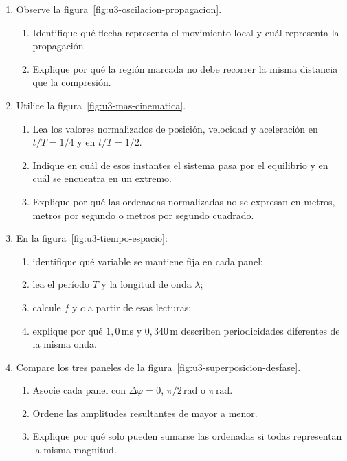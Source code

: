 \begin{enumerate}[label=\textbf{R\arabic*.},leftmargin=*]
    \item Observe la figura~\ref{fig:u3-oscilacion-propagacion}.
    \begin{enumerate}[label=\alph*)]
        \item Identifique qué flecha representa el movimiento local y cuál
        representa la propagación.
        \item Explique por qué la región marcada no debe recorrer la misma
        distancia que la compresión.
    \end{enumerate}

    \item Utilice la figura~\ref{fig:u3-mas-cinematica}.
    \begin{enumerate}[label=\alph*)]
        \item Lea los valores normalizados de posición, velocidad y
        aceleración en \(t/T=1/4\) y en \(t/T=1/2\).
        \item Indique en cuál de esos instantes el sistema pasa por el
        equilibrio y en cuál se encuentra en un extremo.
        \item Explique por qué las ordenadas normalizadas no se expresan en
        metros, metros por segundo o metros por segundo cuadrado.
    \end{enumerate}

    \item En la figura~\ref{fig:u3-tiempo-espacio}:
    \begin{enumerate}[label=\alph*)]
        \item identifique qué variable se mantiene fija en cada panel;
        \item lea el período \(T\) y la longitud de onda \(\lambda\);
        \item calcule \(f\) y \(c\) a partir de esas lecturas;
        \item explique por qué \(1{,}0\,\text{ms}\) y
        \(0{,}340\,\text{m}\) describen periodicidades diferentes de la misma
        onda.
    \end{enumerate}

    \item Compare los tres paneles de la
    figura~\ref{fig:u3-superposicion-desfase}.
    \begin{enumerate}[label=\alph*)]
        \item Asocie cada panel con
        \(\Delta\varphi=0\), \(\pi/2\,\text{rad}\) o
        \(\pi\,\text{rad}\).
        \item Ordene las amplitudes resultantes de mayor a menor.
        \item Explique por qué solo pueden sumarse las ordenadas si todas
        representan la misma magnitud.
    \end{enumerate}


\end{enumerate}
